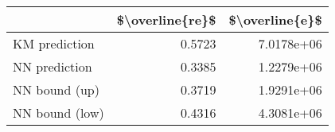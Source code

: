 \begin{tabular}{lrr}
\toprule
{} &  \$\textbackslash overline\{re\}\$ &  \$\textbackslash overline\{e\}\$ \\
\midrule
KM prediction  &           0.5723 &      7.0178e+06 \\
NN prediction  &           0.3385 &      1.2279e+06 \\
NN bound (up)  &           0.3719 &      1.9291e+06 \\
NN bound (low) &           0.4316 &      4.3081e+06 \\
\bottomrule
\end{tabular}
